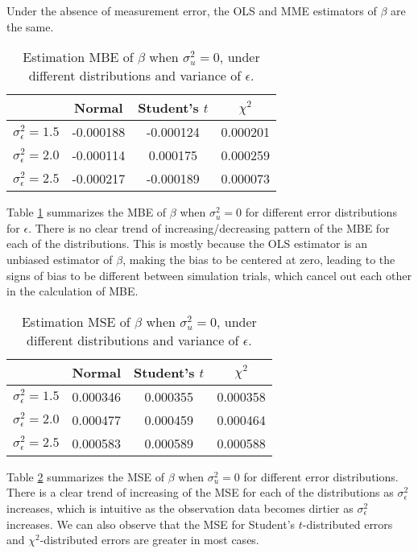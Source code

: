 \documentclass{article}
\begin{document}
Under the absence of measurement error, the OLS and MME estimators of $\beta$ are the same.

\begin{table}[ht]
    \centering
    \caption{Estimation MBE of $\beta$ when $\sigma^2_u=0$, under different distributions and variance of $\epsilon$.}
    \label{Tab:MBE_absence}
    \begin{tabular}[t]{lccc}
        \hline
        &Normal&Student's $t$&$\chi^2$\\
        \hline
        $\sigma^2_\epsilon = 1.5$&-0.000188&-0.000124&0.000201\\
        $\sigma^2_\epsilon = 2.0$&-0.000114&0.000175&0.000259\\
        $\sigma^2_\epsilon = 2.5$&-0.000217&-0.000189&0.000073\\
        \hline
    \end{tabular}
\end{table}

Table \ref{Tab:MBE_absence} summarizes the MBE of $\beta$ when $\sigma^2_u=0$ for different error distributions for $\epsilon$.
There is no clear trend of increasing/decreasing pattern of the MBE for each of the distributions. 
This is mostly because the OLS estimator is an unbiased estimator of $\beta$, making the bias to be centered at zero,
leading to the signs of bias to be different between simulation trials, which cancel out each other in the calculation of MBE. 

\begin{table}[ht]
    \centering
    \caption{Estimation MSE of $\beta$ when $\sigma^2_u=0$, under different distributions and variance of $\epsilon$.}
    \label{Tab:MSE_absence}
    \begin{tabular}[t]{lccc}
        \hline
        &Normal&Student's $t$&$\chi^2$\\
        \hline
        $\sigma^2_\epsilon = 1.5$&0.000346&0.000355&0.000358\\
        $\sigma^2_\epsilon = 2.0$&0.000477&0.000459&0.000464\\
        $\sigma^2_\epsilon = 2.5$&0.000583&0.000589&0.000588\\
        \hline
    \end{tabular}
\end{table}

Table \ref{Tab:MSE_absence} summarizes the MSE of $\beta$ when $\sigma^2_u=0$ for different error distributions.
There is a clear trend of increasing of the MSE for each of the distributions as $\sigma^2_\epsilon$ increases,
which is intuitive as the observation data becomes dirtier as $\sigma^2_\epsilon$ increases.
We can also observe that the MSE for Student's $t$-distributed errors and $\chi^2$-distributed errors are greater in most cases.
\end{document}
